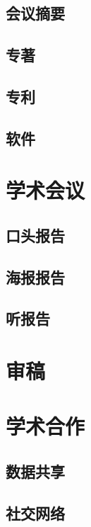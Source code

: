 \documentclass[]{book}
\begin{document}
\subsection{会议摘要}

\subsection{专著}

\subsection{专利}

\subsection{软件}

\section{学术会议}

\subsection{口头报告}

\subsection{海报报告}

\subsection{听报告}

\section{审稿}

\section{学术合作}

\subsection{数据共享}

\subsection{社交网络}
\end{document}
